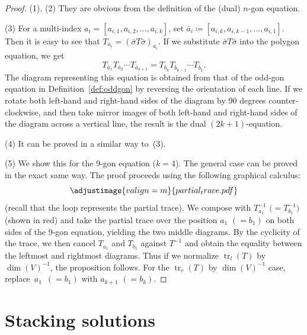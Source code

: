 \documentclass[10pt,a4paper]{amsart}
\numberwithin{equation}{section}
\theoremstyle{definition}
\begin{document}
\begin{proof}
 (1), (2) They are obvious from the definition of the (dual) $n$-gon equation.

 (3) For a multi-index $a_i=[a_{i,1},a_{i,2},\dots, a_{i,k}]$, set $\bar{a}_i\coloneqq [a_{i,k},a_{i,k-1},\dots, a_{i,1}]$.
 Then it is easy to see that $T_{\bar{a}_i}=(\bar{\sigma}T\bar{\sigma})_{a_{i}}$.
 If we substitute $\bar{\sigma}T\bar{\sigma}$ into the polygon equation, we get
 \begin{equation*}
 T_{\bar{a}_1}T_{\bar{a}_2}\cdots T_{\bar{a}_{k+1}} = T_{\bar{b}_{k}}T_{\bar{b}_{k-1}}\cdots T_{\bar{b}_1}.
 \end{equation*}
 The diagram representing this equation is obtained from that of the odd-gon equation in Definition~\ref{def:oddgon} by reversing the orientation of each line.
 If we rotate both left-hand and right-hand sides of the diagram by 90 degrees counter-clockwise, and then take mirror images of both left-hand and right-hand sides of the diagram across a vertical line, the result is the dual $(2k+1)$-equation.

 (4) It can be proved in a similar way to~(3).

 (5) We show this for the 9-gon equation ($k=4$). The general case can be proved in the exact same way. The proof proceeds using the following graphical calculus:
 \begin{equation*}
 \adjustimage{valign=m}{partial_trace.pdf}
 \end{equation*}
 (recall that the loop represents the partial trace). We compose with $T_{a_1}^{-1}$ $\bigl(=T_{b_1}^{-1}\bigr)$ (shown in red) and take the partial trace over the position $a_1$ $(=b_1)$ on both sides of the 9-gon equation, yielding the two middle diagrams. By the cyclicity of the trace, we then cancel $T_{a_1}$ and $T_{b_1}$ against $T^{-1}$ and obtain the equality between the leftmost and rightmost diagrams. Thus if we normalize $\operatorname{tr}_l(T)$ by $\dim(V)^{-1}$, the proposition follows. For the $\operatorname{tr}_r(T)$ by $\dim(V)^{-1}$ case, replace~$a_1$~$(=b_1)$ with $a_{k+1}$ $(=b_k)$.
\end{proof}

\section{Stacking solutions}\label{sec:stacking_solutions}
\end{document}

